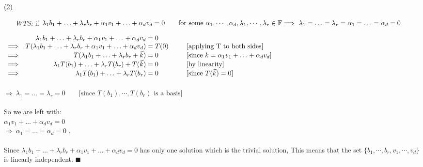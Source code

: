 \documentclass[12pt]{article}
\renewcommand{\qed}{\hfill$\blacksquare$}
\begin{document}
\newpage

\hyperlink{toc}{\hypertarget{2.2}{(2)}}
\begin{itemize}[leftmargin=12mm]
	\item [\emph{WTS:}] if $\lambda_1b_1 + \ldots + \lambda_rb_r + \alpha_1v_1 + \ldots + \alpha_dv_d = 0 \text{\qquad for some } \alpha_1, \cdots, \alpha_d, \lambda_1, \cdots, \lambda_r \in \mathbb{F}\\
		      \Longrightarrow \ \lambda_1 = \ldots = \lambda_r = \alpha_1 = \ldots = \alpha_d = 0$\\
\end{itemize}

$\begin{array}{rr@{}>{\displaystyle}ll}
		                & \lambda_1b_1 + \ldots + \lambda_rb_r + \alpha_1v_1 + \ldots + \alpha_dv_d    & {}= 0               &                                                        \\
		\Longrightarrow & T(\lambda_1b_1 + \ldots + \lambda_rb_r + \alpha_1v_1 + \ldots + \alpha_dv_d) & {}= T(0) \ \ \ \ \  & [\text{applying T to both sides}]                      \\
		\Longrightarrow & T(\lambda_1b_1 + \ldots + \lambda_rb_r + \vec{k})                            & {}= 0               & \text{[since } k = \alpha_1v_1 + \ldots + \alpha_dv_d] \\
		\Longrightarrow & \lambda_1T(b_1) + \ldots + \lambda_rT(b_r) + T(\vec{k})                      & {}= 0               & [\text{by linearity}]                                  \\
		\Longrightarrow & \lambda_1T(b_1) + \ldots + \lambda_rT(b_r)                                   & {}= 0               & [\text{since } T(\vec{k}) = 0]                         \\
	\end{array}$
\\\\
$\Longrightarrow \ \lambda_1 = \ldots = \lambda_r = 0 \qquad \text{[since }T(b_1), \cdots , T(b_r) \text{ is a basis}]$
\\\\
So we are left with:\\
$\alpha_1v_1 + \ldots + \alpha_dv_d=0$\\
$\Longrightarrow \ \alpha_1 = \ldots = \alpha_d = 0$ .
\\\\
Since $\lambda_1b_1 + \ldots + \lambda_rb_r + \alpha_1v_1 + \ldots + \alpha_dv_d = 0$ has only one solution which is the trivial solution,
This means that the set $\{b_1, \cdots ,b_r,v_1,\cdots ,v_d\}$ is linearly independent. \qed
\\\\\\\\\\\\\\\\\\\\
\end{document}
